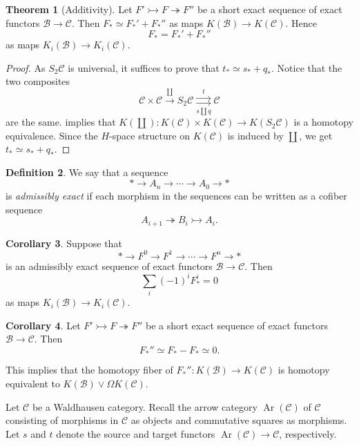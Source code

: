 \documentclass[10pt,letterpaper,cm]{nupset}
\theoremstyle{definition}
\newtheorem{definition}{Definition}[section]
\theoremstyle{theorem}
\newtheorem{theorem}[definition]{Theorem}
\newtheorem{corollary}[definition]{Corollary}
\theoremstyle{remark}
\newcommand{\1}{\mathbf{1}}
\renewcommand{\b}{\mathscr{B}}
\renewcommand{\c}{\mathscr{C}}
\newcommand{\0}{\vec 0}
\DeclareMathOperator{\Ar}{Ar}
\begin{document}
\begin{theorem}[Additivity]\label{add}
Let $F' \rightarrowtail F \twoheadrightarrow F''$ be a short exact sequence of exact functors $\b \to \c$. Then $F_{\ast} \simeq F_{\ast}' + F_{\ast}''$ as maps $K(\b) \to K(\c)$. Hence $$F_{\ast} = F_{\ast}' + F_{\ast}''$$ as maps $K_i(\b) \to K_i(\c)$. 
\end{theorem}
\begin{proof}
As $S_2{\c}$ is universal, it suffices to prove that $t_{\ast}  \simeq s_{\ast} + q_{\ast}$. Notice that the two composites $$\c \times \c \overset{\coprod}{\longrightarrow} S_2{\c}  \underset{s \coprod q}{\overset{t}{\rightrightarrows}} \c$$ are the same.  implies that $K(\coprod): K(\c) \times K(\c) \to K(S_2{\c})$ is a homotopy equivalence. Since the $H$-space structure on $K(\c)$ is induced by $\coprod$, we get $t_{\ast}  \simeq s_{\ast} + q_{\ast}$. 
\end{proof}

\begin{definition}
 We say that a sequence $$\ast \to A_n \to \cdots \to A_0 \to \ast$$ is \textit{admissibly exact} if each morphism in the sequences can be written as a cofiber sequence $$A_{i+1} \twoheadrightarrow B_i \rightarrowtail A_i.$$
\end{definition}

\begin{corollary}
Suppose that $$\ast \to F^0 \to F^1 \to \cdots \to F^n \to \ast$$ is an admissibly exact sequence of exact functors $\b \to \c$. Then $$\sum_i ({-1})^iF_{\ast}^i = 0$$ as maps $K_i(\b) \to K_i(\c)$.
\end{corollary}

\begin{corollary}
Let $F' \rightarrowtail F \twoheadrightarrow F''$ be a short exact sequence of exact functors $\b \to \c$. Then $$F_{\ast}'' \simeq F_{\ast} - F_{\ast} \simeq 0.$$ 
\end{corollary}

This implies that the homotopy fiber of $F_{\ast}'' : K(\b) \to K(\c)$ is homotopy equivalent to $K(\b) \vee \Omega K(\c)$.

\bigskip

Let $\c$ be a Waldhausen category. Recall the arrow category $\Ar(\c)$ of $\c$ consisting of morphisms in $\c$ as objects and commutative squares as morphisms. Let $s$ and $t$ denote the source and target functors $\Ar(\c)\to \c$, respectively. 
\end{document}
